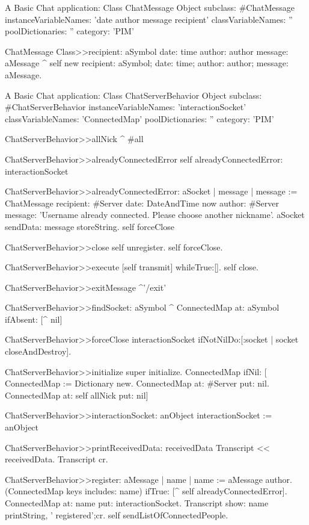 \documentclass[a4paper,10pt,twoside]{book}
\begin{document}
\begin{script}{A Basic Chat application: Class ChatMessage}
Object subclass: #ChatMessage
	instanceVariableNames: 'date author message recipient'
	classVariableNames: ''
	poolDictionaries: ''
	category: 'PIM'

ChatMessage Class>>recipient: aSymbol date: time author: author message: aMessage
	^ self new
			recipient: aSymbol;
			date: time;
			author: author;
			message: aMessage.
\end{script}

\begin{script}{A Basic Chat application: Class ChatServerBehavior}
Object subclass: #ChatServerBehavior
	instanceVariableNames: 'interactionSocket'
	classVariableNames: 'ConnectedMap'
	poolDictionaries: ''
	category: 'PIM'


ChatServerBehavior>>allNick
	^ #all

ChatServerBehavior>>alreadyConnectedError
	self alreadyConnectedError: interactionSocket

ChatServerBehavior>>alreadyConnectedError: aSocket
	| message |
	message := ChatMessage
					recipient: #Server
					date: DateAndTime now
					author: #Server
					message: 'Username already connected. Please choose another nickname'.					
	aSocket sendData: message storeString.
	self forceClose

ChatServerBehavior>>close
	self unregister.
	self forceClose.

ChatServerBehavior>>execute
	[self transmit] whileTrue:[].
	self close.

ChatServerBehavior>>exitMessage
	^'/exit'

ChatServerBehavior>>findSocket: aSymbol
	^ ConnectedMap at: aSymbol ifAbsent: [^ nil]

ChatServerBehavior>>forceClose
	interactionSocket ifNotNilDo:[:socket | socket closeAndDestroy].

ChatServerBehavior>>initialize
	super initialize.
	ConnectedMap 
		ifNil: [
			ConnectedMap := Dictionary new.
			ConnectedMap at: #Server put: nil.
			ConnectedMap at: self allNick put: nil]

ChatServerBehavior>>interactionSocket: anObject
	interactionSocket := anObject

ChatServerBehavior>>printReceivedData: receivedData
	Transcript << receivedData.
	Transcript cr.

ChatServerBehavior>>register: aMessage
	| name |
	name := aMessage author.
	(ConnectedMap keys includes: name)
		ifTrue: [^ self alreadyConnectedError].
	ConnectedMap at: name put: interactionSocket.
	Transcript show: name printString, ' registered';cr.
	self sendListOfConnectedPeople.


\end{script}
\end{document}

